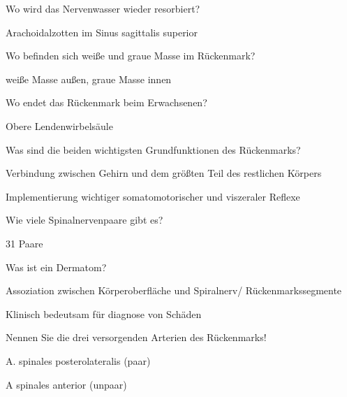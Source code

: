 \documentclass[10pt, a4paper]{exam}
\begin{document}
\begin{questions}
  \question Wo wird das Nervenwasser wieder resorbiert?
  \begin{solution}
    Arachoidalzotten im Sinus sagittalis superior
  \end{solution}

  \question Wo befinden sich weiße und graue Masse im Rückenmark?
  \begin{solution}
    weiße Masse außen, graue Masse innen
  \end{solution}

  \question Wo endet das Rückenmark beim Erwachsenen?
  \begin{solution}
    Obere Lendenwirbelsäule
  \end{solution}

  \question Was sind die beiden wichtigsten Grundfunktionen des Rückenmarks?
  \begin{solution}
    \begin{itemize*}
      \item Verbindung zwischen Gehirn und dem größten Teil des restlichen Körpers
      \item Implementierung wichtiger somatomotorischer und viszeraler Reflexe
    \end{itemize*}
  \end{solution}

  \question Wie viele Spinalnervenpaare gibt es?
  \begin{solution}
    31 Paare
  \end{solution}

  \question Was ist ein Dermatom?
  \begin{solution}
    \begin{itemize*}
      \item Assoziation zwischen Körperoberfläche und Spiralnerv/ Rückenmarkssegmente
      \item Klinisch bedeutsam für diagnose von Schäden
    \end{itemize*}
  \end{solution}

  \question Nennen Sie die drei versorgenden Arterien des Rückenmarks!
  \begin{solution}
    \begin{itemize*}
      \item A. spinales posterolateralis (paar)
      \item A spinales anterior (unpaar)
    \end{itemize*}
  \end{solution}


\end{questions}
\end{document}
